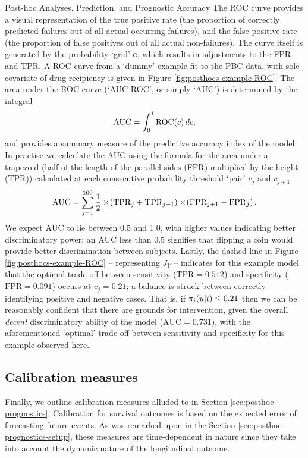 \begin{chapter}{\label{cha:posthoc}Post-hoc Analyses, Prediction, and Prognostic Accuracy}
The ROC curve provides a visual representation of the true positive rate (the proportion of correctly predicted failures out of all actual occurring failures), and the false positive rate (the proportion of false positives out of all actual non-failures). The curve itself is generated by the probability `grid' $\bm{c}$, which results in adjustments to the FPR and TPR. A ROC curve from a `dummy' example fit to the PBC data, with sole covariate of drug recipiency is given in Figure \ref{fig:posthocs-example-ROC}. The area under the ROC curve (`AUC-ROC', or simply `AUC') is determined by the integral
\begin{equation}
    \mathrm{AUC} = \int_0^1\mathrm{ROC}\!\left( c\right) dc,
\label{eq:posthocs-AUC-int}
\end{equation}
and provides a summary measure of the predictive accuracy index of the model. In practise we calculate the AUC using the formula for the area under a trapezoid (half of the length of the parallel sides (FPR) multiplied by the height (TPR)) calculated at each consecutive probability threshold `pair' $c_j$ and $c_{j+1}$
\begin{equation}
    \mathrm{AUC} =\sum_{j=1}^{100}\frac{1}{2}\times\!\left(\mathrm{TPR}_j+\mathrm{TPR}_{j+1}\right)\times\!\left(\mathrm{FPR}_{j+1}-\mathrm{FPR}_{j}\right).
\label{eq:posthocs-AUC-trapz}    
\end{equation}
We expect $\mathrm{AUC}$ to lie between 0.5 and 1.0, with higher values indicating better discriminatory power; an AUC less than $0.5$ signifies that flipping a coin would provide better discrimination between subjects. Lastly, the dashed line in Figure \ref{fig:posthocs-example-ROC} -- representing $J_Y$ -- indicates for this example model that the optimal trade-off between sensitivity ($\mathrm{TPR}=0.512$) and specificity ($\mathrm{FPR} = 0.091$) occurs at $c_j=0.21$; a balance is struck between correctly identifying positive and negative cases. That is, if $\pi_i\!\left( u|t\right)\le 0.21$ then we can be reasonably confident that there are grounds for intervention, given the overall \textit{decent} discriminatory ability of the model ($\mathrm{AUC}=0.731$), with the aforementioned `optimal' trade-off between sensitivity and specificity for this example observed here.

\subsection{Calibration measures}\label{sec:posthoc-prognostics-calibration}
Finally, we outline calibration measures alluded to in Section \ref{sec:posthoc-prognostics}. Calibration for survival outcomes is based on the expected error of forecasting future events. As was remarked upon in the Section \ref{sec:posthoc-prognostics-setup}, these measures are time-dependent in nature since they take into account the dynamic nature of the longitudinal outcome. 


\end{chapter}
